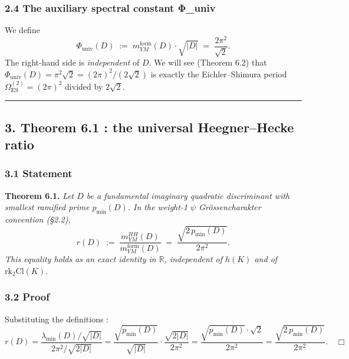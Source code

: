 \documentclass[
  11pt,
  a4paper,
]{amsart}
\begin{document}
\hypertarget{the-auxiliary-spectral-constant-ux3c6_univ}{%
\subsubsection{2.4 The auxiliary spectral constant Φ\_univ}\label{the-auxiliary-spectral-constant-ux3c6_univ}}

We define
\[
\Phi_{\mathrm{univ}}(D) \;:=\; m_{YM}^{\mathrm{form}}(D)\cdot \sqrt{|D|}\;=\;\frac{2\pi^{2}}{\sqrt 2}.
\]
The right-hand side is \emph{independent} of \(D\). We will see (Theorem 6.2) that \(\Phi_{\mathrm{univ}}(D) = \pi^{2}\sqrt 2 = (2\pi)^{2}/(2\sqrt 2)\) is exactly the Eichler--Shimura period \(\Omega_{\mathrm{ES}}^{(2)} = (2\pi)^{2}\) divided by \(2\sqrt 2\).

\begin{center}\rule{0.5\linewidth}{0.5pt}\end{center}

\hypertarget{theorem-6.1-the-universal-heegnerhecke-ratio}{%
\subsection{3. Theorem 6.1 : the universal Heegner--Hecke ratio}\label{theorem-6.1-the-universal-heegnerhecke-ratio}}

\hypertarget{statement}{%
\subsubsection{3.1 Statement}\label{statement}}

\textbf{Theorem 6.1.} \emph{Let \(D\) be a fundamental imaginary quadratic discriminant with smallest ramified prime \(p_{\min}(D)\). In the weight-1 \(\psi\) Grössencharakter convention (§2.2),}
\[
r(D) \;:=\; \frac{m_{YM}^{HH}(D)}{m_{YM}^{\mathrm{form}}(D)} \;=\; \frac{\sqrt{2\,p_{\min}(D)}}{2\pi^{2}}.
\]
\emph{This equality holds as an exact identity in \(\mathbb{R}\), independent of \(h(K)\) and of \(\mathrm{rk}_2 \mathrm{Cl}(K)\).}

\hypertarget{proof}{%
\subsubsection{3.2 Proof}\label{proof}}

Substituting the definitions :
\[
r(D) = \frac{\lambda_{\min}(D)/\sqrt{|D|}}{2\pi^{2}/\sqrt{2|D|}} = \frac{\sqrt{p_{\min}(D)}}{\sqrt{|D|}} \cdot \frac{\sqrt{2|D|}}{2\pi^{2}} = \frac{\sqrt{p_{\min}(D)}\cdot\sqrt 2}{2\pi^{2}} = \frac{\sqrt{2\,p_{\min}(D)}}{2\pi^{2}}. \quad\Box
\]
\end{document}
